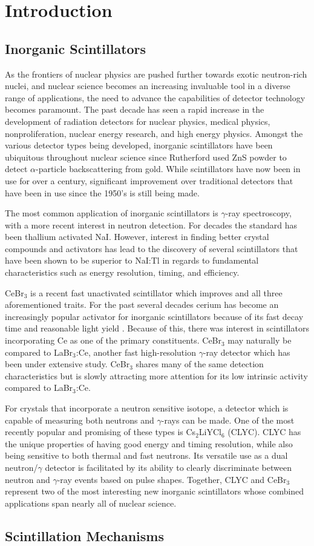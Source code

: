 \chapter{Introduction}
\label{ch:Introduction}
\section{Inorganic Scintillators}
\indent As the frontiers of nuclear physics are pushed further towards exotic neutron-rich nuclei, and nuclear science becomes an increasing invaluable tool in a diverse range of applications, the need to advance the capabilities of detector technology becomes paramount. The past decade has seen a rapid increase in the development of radiation detectors for nuclear physics, medical physics, nonproliferation, nuclear energy research, and high energy physics. Amongst the various detector types being developed, inorganic scintillators have been ubiquitous throughout nuclear science since Rutherford used ZnS powder to detect $\alpha$-particle backscattering from gold. While scintillators have now been in use for over a century, significant improvement over traditional detectors that have been in use since the 1950's is still being made. 

\indent The most common application of inorganic scintillators is $\gamma$-ray spectroscopy, with a more recent interest in neutron detection. For decades the standard has been thallium activated NaI. However, interest in finding better crystal compounds and activators has lead to the discovery of several scintillators that have been shown to be superior to NaI:Tl in regards to fundamental characteristics such as energy resolution, timing, and efficiency. 

\indent CeBr$_3$ is a recent fast unactivated scintillator which improves and all three aforementioned traits. For the past several decades cerium has become an increasingly popular activator for inorganic scintillators because of its fast decay time and reasonable light yield \cite{GK00}. Because of this, there was interest in scintillators incorporating Ce as one of the primary constituents. CeBr$_3$ may naturally be compared to LaBr$_3$:Ce, another fast high-resolution $\gamma$-ray detector which has been under extensive study. CeBr$_3$ shares many of the same detection characteristics but is slowly attracting more attention for its low intrinsic activity compared to LaBr$_3$:Ce. 

\indent For crystals that incorporate a neutron sensitive isotope, a detector which is capable of measuring both neutrons and $\gamma$-rays can be made. One of the most recently popular and promising of these types is Cs$_2$LiYCl$_6$ (CLYC). CLYC has the unique properties of having good energy and timing resolution, while also being sensitive to both thermal and fast neutrons. Its versatile use as a dual neutron/$\gamma$ detector is facilitated by its ability to clearly discriminate between neutron and $\gamma$-ray events based on pulse shapes. Together, CLYC and CeBr$_3$ represent two of the most interesting new inorganic scintillators whose combined applications span nearly all of nuclear science.

\section{Scintillation Mechanisms}
\indent 




 


 